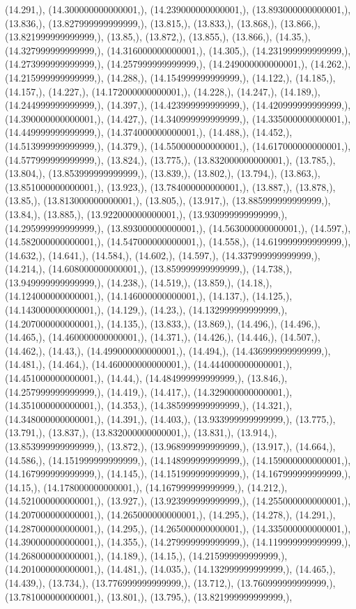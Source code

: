 \documentclass{article}
\begin{document}
(14.291,), (14.300000000000001,), (14.239000000000001,), (13.893000000000001,), (13.836,), (13.827999999999999,), (13.815,), (13.833,), (13.868,), (13.866,), (13.821999999999999,), (13.85,), (13.872,), (13.855,), (13.866,), (14.35,), (14.327999999999999,), (14.316000000000001,), (14.305,), (14.231999999999999,), (14.273999999999999,), (14.257999999999999,), (14.249000000000001,), (14.262,), (14.215999999999999,), (14.288,), (14.154999999999999,), (14.122,), (14.185,), (14.157,), (14.227,), (14.172000000000001,), (14.228,), (14.247,), (14.189,), (14.244999999999999,), (14.397,), (14.423999999999999,), (14.420999999999999,), (14.390000000000001,), (14.427,), (14.340999999999999,), (14.335000000000001,), (14.449999999999999,), (14.374000000000001,), (14.488,), (14.452,), (14.513999999999999,), (14.379,), (14.550000000000001,), (14.617000000000001,), (14.577999999999999,), (13.824,), (13.775,), (13.832000000000001,), (13.785,), (13.804,), (13.853999999999999,), (13.839,), (13.802,), (13.794,), (13.863,), (13.851000000000001,), (13.923,), (13.784000000000001,), (13.887,), (13.878,), (13.85,), (13.813000000000001,), (13.805,), (13.917,), (13.885999999999999,), (13.84,), (13.885,), (13.922000000000001,), (13.930999999999999,), (14.295999999999999,), (13.893000000000001,), (14.563000000000001,), (14.597,), (14.582000000000001,), (14.547000000000001,), (14.558,), (14.619999999999999,), (14.632,), (14.641,), (14.584,), (14.602,), (14.597,), (14.337999999999999,), (14.214,), (14.608000000000001,), (13.859999999999999,), (14.738,), (13.949999999999999,), (14.238,), (14.519,), (13.859,), (14.18,), (14.124000000000001,), (14.146000000000001,), (14.137,), (14.125,), (14.143000000000001,), (14.129,), (14.23,), (14.132999999999999,), (14.207000000000001,), (14.135,), (13.833,), (13.869,), (14.496,), (14.496,), (14.465,), (14.460000000000001,), (14.371,), (14.426,), (14.446,), (14.507,), (14.462,), (14.43,), (14.499000000000001,), (14.494,), (14.436999999999999,), (14.481,), (14.464,), (14.460000000000001,), (14.444000000000001,), (14.451000000000001,), (14.44,), (14.484999999999999,), (13.846,), (14.257999999999999,), (14.419,), (14.417,), (14.329000000000001,), (14.351000000000001,), (14.353,), (14.385999999999999,), (14.321,), (14.348000000000001,), (14.391,), (14.403,), (13.933999999999999,), (13.775,), (13.791,), (13.837,), (13.832000000000001,), (13.831,), (13.914,), (13.853999999999999,), (13.872,), (13.968999999999999,), (13.917,), (14.664,), (14.586,), (14.151999999999999,), (14.148999999999999,), (14.159000000000001,), (14.167999999999999,), (14.145,), (14.151999999999999,), (14.167999999999999,), (14.15,), (14.178000000000001,), (14.167999999999999,), (14.212,), (14.521000000000001,), (13.927,), (13.923999999999999,), (14.255000000000001,), (14.207000000000001,), (14.265000000000001,), (14.295,), (14.278,), (14.291,), (14.287000000000001,), (14.295,), (14.265000000000001,), (14.335000000000001,), (14.390000000000001,), (14.355,), (14.279999999999999,), (14.119999999999999,), (14.268000000000001,), (14.189,), (14.15,), (14.215999999999999,), (14.201000000000001,), (14.481,), (14.035,), (14.132999999999999,), (14.465,), (14.439,), (13.734,), (13.776999999999999,), (13.712,), (13.760999999999999,), (13.781000000000001,), (13.801,), (13.795,), (13.821999999999999,), 
\end{document}
